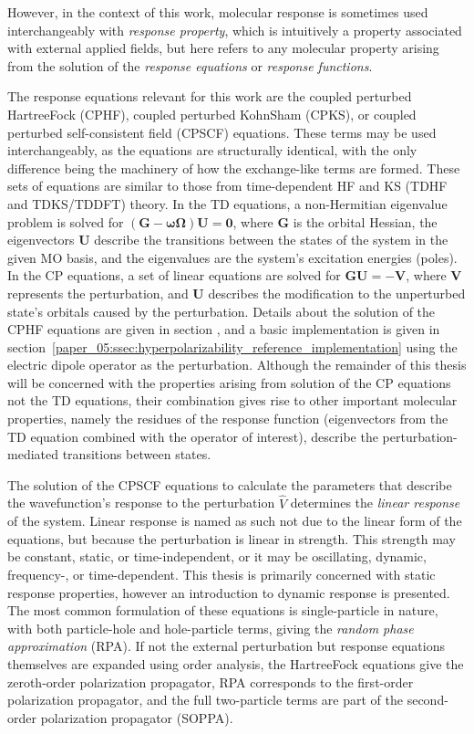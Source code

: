 \documentclass[%
class = book,%
crop = false,%
float = true,%
multi = true,%
preview = false,%
]{standalone}
\let\cite\autocite
\newcommand\hf{Hartree\textendash{}Fock}
\begin{document}
However, in the context of this work, molecular response is sometimes used interchangeably with \emph{response property}, which is intuitively a property associated with external applied fields, but here refers to any molecular property arising from the solution of the \emph{response equations} or \emph{response functions}.


The response equations relevant for this work are the coupled perturbed \hf{} (CPHF), coupled perturbed Kohn\textendash{}Sham (CPKS), or coupled perturbed self-consistent field (CPSCF) equations. These terms may be used interchangeably, as the equations are structurally identical, with the only difference being the machinery of how the exchange-like terms are formed. These sets of equations are similar to those from time-dependent HF and KS (TDHF and TDKS/TDDFT) theory. In the TD equations, a non-Hermitian eigenvalue problem is solved for \((\mathbf{G} - \mathbf{\omega\Omega})\mathbf{U} = \mathbf{0}\), where \(\mathbf{G}\) is the orbital Hessian, the eigenvectors \(\mathbf{U}\) describe the transitions between the states of the system in the given MO basis, and the eigenvalues are the system's excitation energies (poles). In the CP equations, a set of linear equations are solved for \(\mathbf{GU} = -\mathbf{V}\), where \(\mathbf{V}\) represents the perturbation, and \(\mathbf{U}\) describes the modification to the unperturbed state's orbitals caused by the perturbation. Details about the solution of the CPHF equations are given in section , and a basic implementation is given in section~\ref{paper_05:ssec:hyperpolarizability_reference_implementation} using the electric dipole operator as the perturbation. Although the remainder of this thesis will be concerned with the properties arising from solution of the CP equations not the TD equations, their combination gives rise to other important molecular properties, namely the residues of the response function (eigenvectors from the TD equation combined with the operator of interest), describe the perturbation-mediated transitions between states.

The solution of the CPSCF equations to calculate the parameters that describe the wavefunction's response to the perturbation \(\hat{V}\) determines the \emph{linear response} of the system. Linear response is named as such not due to the linear form of the equations, but because the perturbation is linear in strength. This strength may be constant, static, or time-independent, or it may be oscillating, dynamic, frequency-, or time-dependent. This thesis is primarily concerned with static response properties, however an introduction to dynamic response is presented. The most common formulation of these equations is single-particle in nature, with both particle-hole and hole-particle terms, giving the \emph{random phase approximation} (RPA). If not the external perturbation but response equations themselves are expanded using order analysis, the \hf{} equations give the zeroth-order polarization propagator, RPA corresponds to the first-order polarization propagator, and the full two-particle terms are part of the second-order polarization propagator (SOPPA)\cite{ODDERSHEDE198433}.
\end{document}
